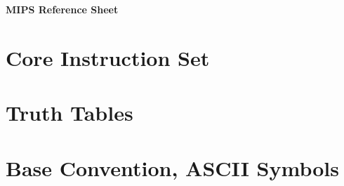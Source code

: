 \documentclass[10pt]{article}
\begin{document}
\thispagestyle{empty}

\textbf{\Huge MIPS Reference Sheet}


\begin{minipage}[t]{0.68\linewidth}
    \begin{minipage}[t]{\linewidth}
        \section*{Core Instruction Set}
        
    \end{minipage}

    \begin{minipage}[t]{\linewidth}
        
    \end{minipage}

    \begin{minipage}[t]{\linewidth}
        \section*{Truth Tables}
        
    \end{minipage}

\end{minipage}
\hfill
\begin{minipage}[t]{0.3\linewidth}
    \begin{minipage}[t]{\linewidth}
        
    \end{minipage}

    \begin{minipage}[t]{\linewidth}
        \section*{Base Convention, ASCII Symbols}
        \centering
        
    \end{minipage}

    \begin{minipage}[t]{\linewidth}
        
    \end{minipage}
\end{minipage}
\end{document}
